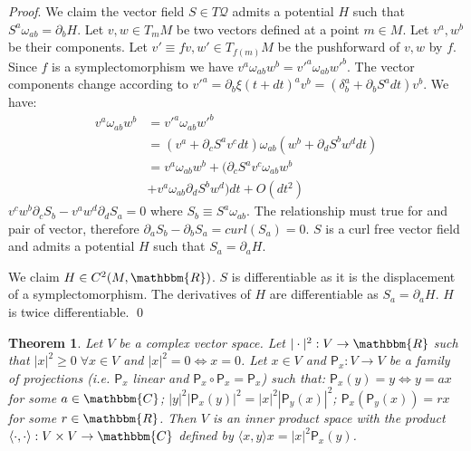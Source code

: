 \documentclass[aps,pra,10pt,twocolumn,floatfix,nofootinbib]{revtex4-1}
\numberwithin{equation}{section}
\newtheorem{thrm}[equation]{Theorem}
\theoremstyle{definition}
\renewenvironment{proof}{\emph{Proof}.}{\qed}
\begin{document}
\begin{proof}
	We claim the vector field $S \in T\mathcal{Q}$ admits a potential $H$ such that $S^{a} \omega_{ab} = \partial_{b}H$. Let $v, w \in T_m M$ be two vectors defined at a point $m \in M$. Let $v^a, w^b$ be their components. Let $v'\equiv f v, w' \in T_{f(m)}M$ be the pushforward of $v, w$ by $f$. Since $f$ is a symplectomorphism we have $v^{a} \omega_{ab} w^{b} = v'^{a} \omega_{ab} w'^{b}$. The vector components change according to $v'^a = \partial_b \xi(t+dt)^a v^b = (\delta^a_b + \partial_b S^a dt) v^b$. We have:
	\begin{align*}
	v^{a} \omega_{ab} w^{b} &= v'^{a} \omega_{ab} w'^{b}  \\
	&= (v^{a} + \partial_{c} S^{a} v^{c} dt) \omega_{ab} ( w^{b} + \partial_{d} S^{b} w^{d} dt) \\
	&= v^{a} \omega_{ab} w^{b} + (\partial_{c} S^{a} v^{c} \omega_{ab} w^{b} \\
	&+ v^{a} \omega_{ab} \partial_{d} S^{b} w^{d}) dt + O(dt^2)
	\end{align*}
	$v^{c} w^{b} \partial_{c} S_{b} - v^{a} w^{d} \partial_{d} S_{a} = 0$ where $S_{b} \equiv S^{a} \omega_{ab}$. The relationship must true for and pair of vector, therefore $\partial_{a} S_{b} - \partial_{b} S_{a} = curl(S_{a}) = 0$. $S$ is a curl free vector field and admits a potential $H$ such that $S_{a} = \partial_{a}H$.
	
	We claim $H \in C^2(M, \mathbbm{R})$. $S$ is differentiable as it is the displacement of a symplectomorphism. The derivatives of $H$ are differentiable as $S_{a} = \partial_{a}H$. $H$ is twice differentiable.
\end{proof}

\begin{thrm}
	Let $V$ be a complex vector space. Let $| \cdot | ^2 : V \rightarrow \mathbbm{R}$ such that $|x|^2 \ge 0 \; \forall x \in V$ and $|x|^2 = 0 \Leftrightarrow x = 0$. Let $x \in V$ and $\mathsf{P}_x : V \rightarrow V$ be a family of projections (i.e. $\mathsf{P}_x$ linear and $\mathsf{P}_x \circ \mathsf{P}_x = \mathsf{P}_x$) such that: $\mathsf{P}_x (y) = y \Leftrightarrow y = a x$ for some $a \in \mathbbm{C}$; $|y|^2|\mathsf{P}_x (y)|^2=|x|^2|\mathsf{P}_y (x)|^2$; $\mathsf{P}_x (\mathsf{P}_y (x)) = r x$ for some $r \in \mathbbm{R}$.
	Then $V$ is an inner product space with the product $\langle \cdot , \cdot \rangle : V \times V \rightarrow \mathbbm{C}$ defined by $\langle x , y \rangle x = |x|^2 \mathsf{P}_x (y)$.
\end{thrm}
\end{document}
